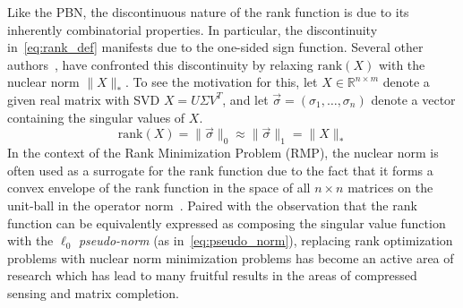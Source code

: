 \documentclass[10pt]{article}
\numberwithin{equation}{section}
\newcommand{\+}{%
	\raisebox{0.18ex}{\scaleobj{0.55}{+}}
}
\theoremstyle{definition}
\begin{document}
Like the PBN, the discontinuous nature of the rank function is due to its inherently combinatorial properties. In particular, the discontinuity in~\eqref{eq:rank_def} manifests due to the one-sided sign function. 
Several other authors~\cite{}, have confronted this discontinuity by relaxing $\mathrm{rank}(X)$ with the nuclear norm $\lVert X\rVert_\ast$. To see the motivation for this, let $X \in \mathbb{R}^{n \times m}$ denote a given real matrix with SVD $X = U \Sigma V^T$, and let $\vec{\sigma} = (\sigma_1, \dots, \sigma_n)$ denote a vector containing the singular values of $X$.  
\begin{equation}\label{eq:pseudo_norm}
	\mathrm{rank}(X) = \lVert \vec{\sigma} \rVert_0  \approx \lVert \vec{\sigma} \rVert_1 = \lVert X \rVert_\ast 
\end{equation}
In the context of the Rank Minimization Problem (RMP), the nuclear norm is often used as a surrogate for the rank function due to the fact that it forms a convex envelope of the rank function in the space of all $n \times n$ matrices on the unit-ball in the operator norm~\cite{}. 
Paired with the observation that the rank function can be equivalently expressed as composing the singular value function with the $\ell_0$ \emph{pseudo-norm} (as in~\eqref{eq:pseudo_norm}), replacing rank optimization problems with nuclear norm minimization problems has become an active area of research which has lead to many fruitful results in the areas of compressed sensing and matrix completion. 
\end{document}
